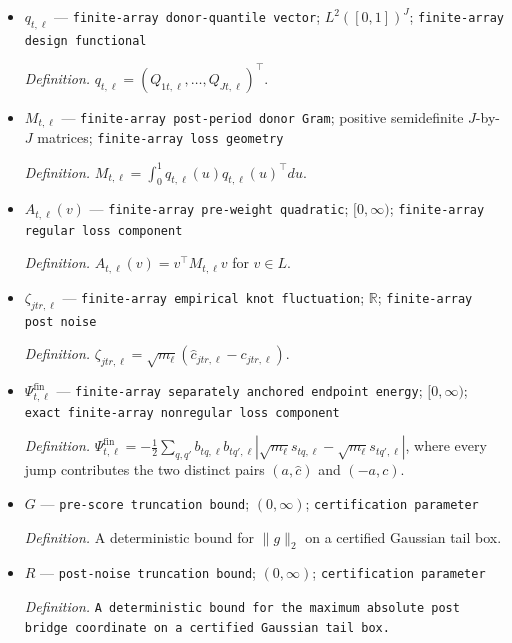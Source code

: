 \documentclass{article}
\begin{document}
\begin{itemize}
  \item \(q_{t,\ell}\) --- \texttt{finite-\allowbreak{}array donor-\allowbreak{}quantile vector}; \(L^2([0,1])^J\); \texttt{finite-\allowbreak{}array design functional}
  \par\smallskip\noindent\emph{Definition.} \(q_{t,\ell}=(Q_{1t,\ell},\ldots,Q_{Jt,\ell})^\top\).
  \item \(M_{t,\ell}\) --- \texttt{finite-\allowbreak{}array post-\allowbreak{}period donor Gram}; positive semidefinite \(J\)-by-\(J\) matrices; \texttt{finite-\allowbreak{}array loss geometry}
  \par\smallskip\noindent\emph{Definition.} \(M_{t,\ell}=\int_0^1q_{t,\ell}(u)q_{t,\ell}(u)^\top du\).
  \item \(A_{t,\ell}(v)\) --- \texttt{finite-\allowbreak{}array pre-\allowbreak{}weight quadratic}; \([0,\infty)\); \texttt{finite-\allowbreak{}array regular loss component}
  \par\smallskip\noindent\emph{Definition.} \(A_{t,\ell}(v)=v^\top M_{t,\ell}v\) for \(v\in L\).
  \item \(\zeta_{jtr,\ell}\) --- \texttt{finite-\allowbreak{}array empirical knot fluctuation}; \(\mathbb R\); \texttt{finite-\allowbreak{}array post noise}
  \par\smallskip\noindent\emph{Definition.} \(\zeta_{jtr,\ell}=\sqrt{m_\ell}(\widehat c_{jtr,\ell}-c_{jtr,\ell})\).
  \item \(\Psi^{\mathrm{fin}}_{t,\ell}\) --- \texttt{finite-\allowbreak{}array separately anchored endpoint energy}; \([0,\infty)\); \texttt{exact finite-\allowbreak{}array nonregular loss component}
  \par\smallskip\noindent\emph{Definition.} \(\Psi^{\mathrm{fin}}_{t,\ell}=-\tfrac12\sum_{q,q'}b_{tq,\ell}b_{tq',\ell}|\sqrt{m_\ell}s_{tq,\ell}-\sqrt{m_\ell}s_{tq',\ell}|\), where every jump contributes the two distinct pairs \((a,\widehat c)\) and \((-a,c)\).
  \item \(G\) --- \texttt{pre-\allowbreak{}score truncation bound}; \((0,\infty)\); \texttt{certification parameter}
  \par\smallskip\noindent\emph{Definition.} A deterministic bound for \(\|g\|_2\) on a certified Gaussian tail box.
  \item \(R\) --- \texttt{post-\allowbreak{}noise truncation bound}; \((0,\infty)\); \texttt{certification parameter}
  \par\smallskip\noindent\emph{Definition.} \texttt{A deterministic bound for the maximum absolute post bridge coordinate on a certified Gaussian tail box.}

\end{itemize}
\end{document}
